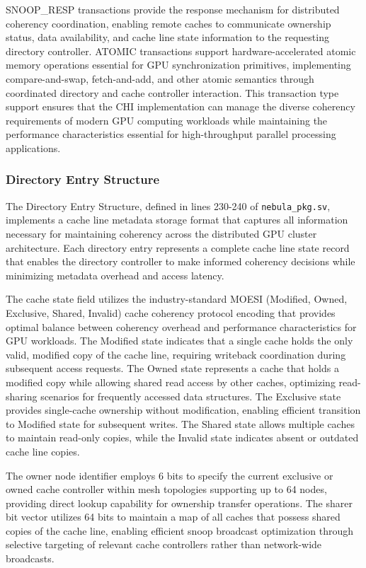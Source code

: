 \documentclass[12pt,letterpaper]{article}
\begin{document}
SNOOP\_RESP transactions provide the response mechanism for distributed coherency coordination, enabling remote caches to communicate ownership status, data availability, and cache line state information to the requesting directory controller. ATOMIC transactions support hardware-accelerated atomic memory operations essential for GPU synchronization primitives, implementing compare-and-swap, fetch-and-add, and other atomic semantics through coordinated directory and cache controller interaction. This transaction type support ensures that the CHI implementation can manage the diverse coherency requirements of modern GPU computing workloads while maintaining the performance characteristics essential for high-throughput parallel processing applications.

\subsubsection{Directory Entry Structure}

The Directory Entry Structure, defined in lines 230-240 of \texttt{nebula\_pkg.sv}, implements a cache line metadata storage format that captures all information necessary for maintaining coherency across the distributed GPU cluster architecture. Each directory entry represents a complete cache line state record that enables the directory controller to make informed coherency decisions while minimizing metadata overhead and access latency.

The cache state field utilizes the industry-standard MOESI (Modified, Owned, Exclusive, Shared, Invalid) cache coherency protocol encoding that provides optimal balance between coherency overhead and performance characteristics for GPU workloads. The Modified state indicates that a single cache holds the only valid, modified copy of the cache line, requiring writeback coordination during subsequent access requests. The Owned state represents a cache that holds a modified copy while allowing shared read access by other caches, optimizing read-sharing scenarios for frequently accessed data structures. The Exclusive state provides single-cache ownership without modification, enabling efficient transition to Modified state for subsequent writes. The Shared state allows multiple caches to maintain read-only copies, while the Invalid state indicates absent or outdated cache line copies.

The owner node identifier employs 6 bits to specify the current exclusive or owned cache controller within mesh topologies supporting up to 64 nodes, providing direct lookup capability for ownership transfer operations. The sharer bit vector utilizes 64 bits to maintain a map of all caches that possess shared copies of the cache line, enabling efficient snoop broadcast optimization through selective targeting of relevant cache controllers rather than network-wide broadcasts.
\end{document}
